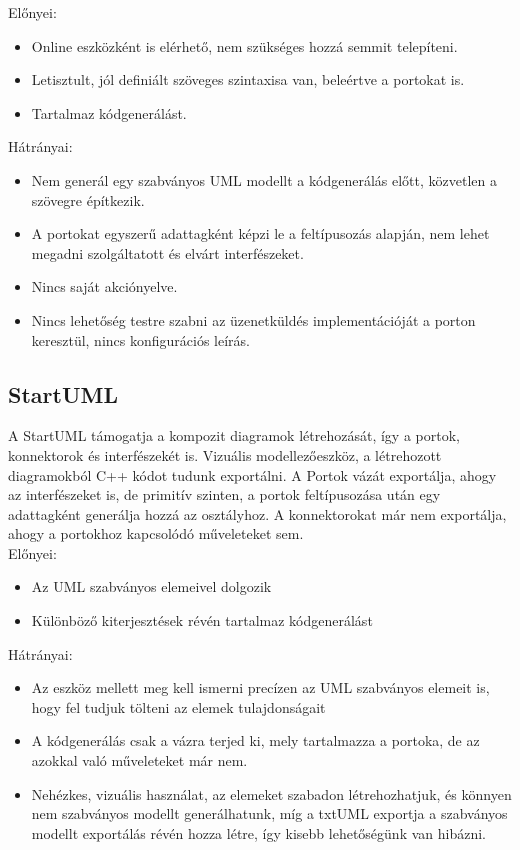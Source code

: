 \documentclass[a4paper,12pt]{report}
\begin{document}
Előnyei:
\begin{itemize}
\item Online eszközként is elérhető, nem szükséges hozzá semmit telepíteni.
\item Letisztult, jól definiált szöveges szintaxisa van, beleértve a portokat is.
\item Tartalmaz kódgenerálást.
\end{itemize}
Hátrányai:
\begin{itemize}
\item Nem generál egy szabványos UML modellt a kódgenerálás előtt, közvetlen a szövegre építkezik.
\item A portokat egyszerű adattagként képzi le a feltípusozás alapján, nem lehet megadni szolgáltatott és elvárt interfészeket.
\item Nincs saját akciónyelve.
\item Nincs lehetőség testre szabni az üzenetküldés implementációját a porton keresztül, nincs konfigurációs leírás.
\end{itemize}

\subsection{StartUML}
A StartUML  támogatja a kompozit diagramok létrehozását, így a portok, konnektorok és interfészekét is. Vizuális modellezőeszköz, a létrehozott diagramokból C++ kódot tudunk exportálni. A Portok vázát exportálja, ahogy az interfészeket is, de primitív szinten, a portok feltípusozása után egy adattagként generálja hozzá az osztályhoz. A konnektorokat már nem exportálja, ahogy a portokhoz kapcsolódó műveleteket sem. \\
Előnyei:
\begin{itemize}
\item Az UML szabványos elemeivel dolgozik
\item Különböző kiterjesztések révén tartalmaz kódgenerálást
\end{itemize}
Hátrányai:
\begin{itemize}
\item Az eszköz mellett meg kell ismerni precízen az UML szabványos elemeit is, hogy fel tudjuk tölteni az elemek tulajdonságait
\item A kódgenerálás csak a vázra terjed ki, mely tartalmazza a portoka, de az azokkal való műveleteket már nem.
\item Nehézkes, vizuális használat, az elemeket szabadon létrehozhatjuk, és könnyen nem szabványos modellt generálhatunk, míg a txtUML exportja a szabványos modellt exportálás révén hozza létre, így kisebb lehetőségünk van hibázni.
\end{itemize}
\end{document}
